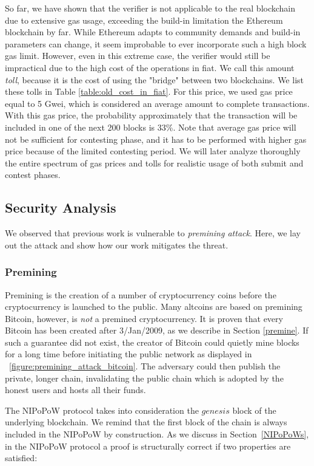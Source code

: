 So far, we have shown that the verifier is not applicable to the real
blockchain due to extensive gas usage, exceeding the build-in limitation the
Ethereum blockchain by far. While Ethereum adapts to community demands and
build-in parameters can change, it seem improbable to ever incorporate such a
high block gas limit. However, even in this extreme case, the verifier would
still be impractical due to the high cost of the operations in fiat. We call
this amount \emph{toll}, because it is the cost of using the "bridge" between
two blockchains. We list these tolls in Table \ref{table:old_cost_in_fiat}. For
this price, we used gas price equal to 5 Gwei, which is considered an average
amount to complete transactions. With this gas price, the probability
approximately that the transaction will be included in one of the next 200
blocks is 33\%. Note that average gas price will not be sufficient for
contesting phase, and it has to be performed with higher gas price because of
the limited contesting period. We will later analyze thoroughly the entire
spectrum of gas prices and tolls for realistic usage of both submit and contest
phases.

\subsection{Security Analysis}

We observed that previous work is vulnerable to \emph{premining attack}. Here,
we lay out the attack and show how our work mitigates the threat.

\subsubsection{Premining} Premining is the creation of a number of
cryptocurrency coins before the cryptocurrency is launched to the public. Many
altcoins are based on premining Bitcoin, however, is \emph{not} a premined
cryptocurrency. It is proven that every Bitcoin has been created after
3/Jan/2009, as we describe in Section \ref{premine}. If such a guarantee did
not exist, the creator of Bitcoin could quietly mine blocks for a long time
before initiating the public network as displayed in
~\ref{figure:premining_attack_bitcoin}. The adversary could then publish the
private, longer chain, invalidating the public chain which is adopted by the
honest users and hosts all their funds.



The NIPoPoW protocol takes into consideration the $genesis$ block of the
underlying blockchain. We remind that the first block of the chain is always
included in the NIPoPoW by construction. As we discuss in
Section~\ref{NIPoPoWs}, in the NIPoPoW protocol a proof is structurally correct
if two properties are satisfied:

